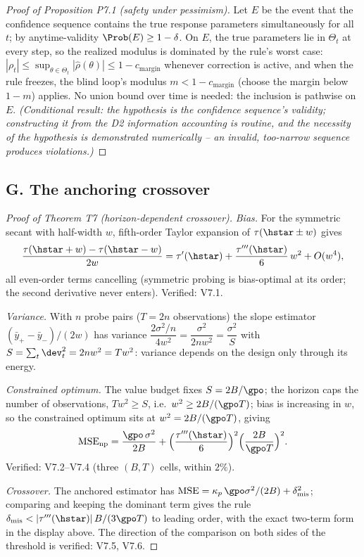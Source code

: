 \documentclass[11pt]{article}
\begin{document}
\begin{proof}[Proof of Proposition P7.1 (safety under pessimism)]
Let $E$ be the event that the confidence sequence contains the true
response parameters simultaneously for all $t$; by anytime-validity
$\Prob(E) \ge 1-\delta$. On $E$, the true parameters lie in $\Theta_t$ at
every step, so the realized modulus is dominated by the rule's worst case:
$|\rho_t| \le \sup_{\theta\in\Theta_t}|\hat\rho(\theta)| \le 1 -
c_{\mathrm{margin}}$ whenever correction is active, and when the rule
freezes, the blind loop's modulus $m < 1 - c_{\mathrm{margin}}$ (choose the
margin below $1 - m$) applies. No union bound over time is needed: the
inclusion is pathwise on $E$. \emph{(Conditional result: the hypothesis is
the confidence sequence's validity; constructing it from the D2
information accounting is routine, and the necessity of the hypothesis is
demonstrated numerically -- an invalid, too-narrow sequence produces
violations.)}
\end{proof}

\subsection*{G. The anchoring crossover}

\begin{proof}[Proof of Theorem T7 (horizon-dependent crossover)]
\emph{Bias.} For the symmetric secant with half-width $w$, fifth-order
Taylor expansion of $\tau(\hstar \pm w)$ gives
\[
\frac{\tau(\hstar + w) - \tau(\hstar - w)}{2w}
 = \tau'(\hstar) + \frac{\tau'''(\hstar)}{6}\,w^2 + O(w^4),
\]
all even-order terms cancelling (symmetric probing is bias-optimal at its
order; the second derivative never enters). Verified: V7.1.

\emph{Variance.} With $n$ probe pairs ($T = 2n$ observations) the slope
estimator $(\bar y_+ - \bar y_-)/(2w)$ has variance
$\dfrac{2\sigma^2/n}{4w^2} = \dfrac{\sigma^2}{2nw^2} = \dfrac{\sigma^2}{S}$ with
$S = \sum_t \dev_t^2 = 2n w^2 = T w^2$: variance depends on the design only
through its energy.

\emph{Constrained optimum.} The value budget fixes $S = 2B/\gpo$; the
horizon caps the number of observations, $T w^2 \ge S$, i.e.\
$w^2 \ge 2B/(\gpo T)$; bias is increasing in $w$, so the constrained
optimum sits at $w^2 = 2B/(\gpo T)$, giving
\[
\mathrm{MSE}_{\mathrm{np}} = \frac{\gpo\,\sigma^2}{2B}
 + \Big(\frac{\tau'''(\hstar)}{6}\Big)^2\Big(\frac{2B}{\gpo T}\Big)^2 .
\]
Verified: V7.2--V7.4 (three $(B, T)$ cells, within $2\%$).

\emph{Crossover.} The anchored estimator has
$\mathrm{MSE} = \kappa_p\,\gpo\sigma^2/(2B) + \delta_{\mathrm{mis}}^2$;
comparing and keeping the dominant term gives the rule
$\delta_{\mathrm{mis}} < |\tau'''(\hstar)|\,B/(3\gpo T)$ to leading order,
with the exact two-term form in the display above. The direction of the
comparison on both sides of the threshold is verified: V7.5, V7.6.
\end{proof}
\end{document}
